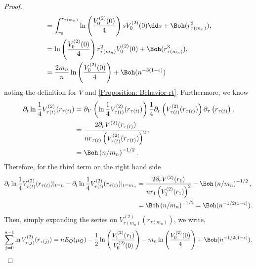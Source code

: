 \begin{proof}
\begin{align}
		& = \int_{r_0}^{r_{\tau(m_n)}} \ln\left( \frac{V^{(2)}_0(0)}{4} \right) s V^{(2)}_0(0)  \dd s + \Boh(r_{\tau(m_n)}^3), \\
		& =  \ln\left( \frac{V^{(2)}_0(0)}{4} \right) r_{\tau(m_n)}^2 V^{(2)}_0(0) + \Boh(r_{\tau(m_n)}^3), \\
		& = \frac{2m_n}{n}\ln\left( \frac{V^{(2)}_0(0)}{4} \right)  + \Boh(n^{-3(1-\epsilon)}) 
	\end{align}
	noting the definition for $V$ and \autoref{Proposition: Behavior rt}. Furthermore, we know 
	\begin{align}
		\partial_t \ln \frac{1}{4}V^{(2)}_{\tau(t)}(r_{\tau(t)}) & = \partial_V \left( \ln \frac{1}{4} V^{(2)}_{\tau(t)}(r_{\tau(t)}) \right)  \frac{1}{4}  \partial_r \left( V^{(2)}_{\tau(t)}(r_{\tau(t)}) \right) \partial_\tau \left( r_{\tau(t)} \right), \\
		& = \frac{2 \partial_r V^{(2)} (r_{\tau(t)})}{ n r_{\tau(t)} \left( V^{(2)}_{\tau(t)}(r_{\tau(t)})\right)^2}, \\
		& = \Boh\left( n/m_n \right)^{-1/2}.
	\end{align}
	Therefore, for the third term on the right hand side
	\begin{align}
		\partial_t \ln \frac{1}{4} V^{(2)}_{\tau(t)}(r_{\tau(t)}) |_{t=n} - \partial_t \ln \frac{1}{4} V^{(2)}_{\tau(t)}(r_{\tau(t)}) |_{t=m_n} & = \frac{2 \partial_r V^{(2)}(r_{1})}{ n r_1 \left( V^{(2)}_1(r_1)\right)^2} - \Boh\left( n/m_n \right)^{-1/2}, \\ 
		& =\Boh\left( n/m_n \right)^{-1/2} = \Boh(n^{-1/2(1-\epsilon)}).
	\end{align}
	Then, simply expanding the series on $V^{(2)}_{\tau(m_n)}(r_{\tau(m_n)})$, we write,
	\begin{equation}
		\sum_{j=0}^{n-1}  \ln V^{(2)}_{\tau(j)}(r_{\tau(j)})  = n E_Q(\mu_Q)  - \frac{1}{2} \ln \left( \frac{V^{(2)}_{1}(r_1)}{V^{(2)}_{0}(0)} \right) - m_n \ln\left(  \frac{V^{(2)}_0(0)}{4} \right)  + \Boh(n^{-1/2(1-\epsilon)}).
		\label{Equation: logV annulus}
	\end{equation}
\end{proof}

